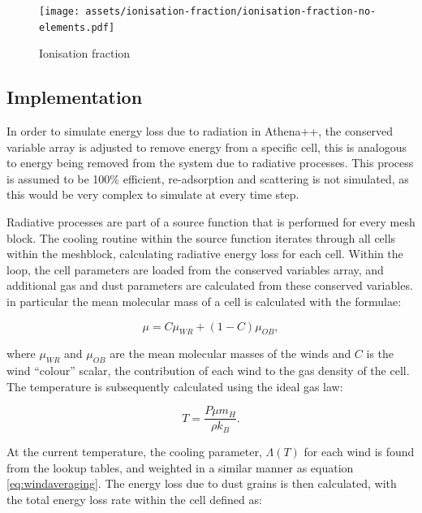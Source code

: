 \begin{figure}
  \centering
  \texttt{[image: assets/ionisation-fraction/ionisation-fraction-no-elements.pdf]}
  \caption[Ionisation fraction for OB and WC stars]{Ionisation fraction}
  \label{fig:electron-curve-no-elements}
\end{figure}



\subsection{Implementation}
\label{sec:cooling-implementation}

In order to simulate energy loss due to radiation in Athena++, the conserved variable array is adjusted to remove energy from a specific cell, this is analogous to energy being removed from the system due to radiative processes.
This process is assumed to be 100\% efficient, re-adsorption and scattering is not simulated, as this would be very complex to simulate at every time step.


Radiative processes are part of a source function that is performed for every mesh block.
The cooling routine within the source function iterates through all cells within the meshblock, calculating radiative energy loss for each cell.
Within the loop, the cell parameters are loaded from the conserved variables array, and additional gas and dust parameters are calculated from these conserved variables.
in particular the mean molecular mass of a cell is calculated with the formulae:

\begin{equation}
  \mu = C\mu_{WR} + (1-C) \mu_{OB}, \label{eq:windaveraging}
\end{equation}

\noindent
where $\mu_{WR}$ and $\mu_{OB}$ are the mean molecular masses of the winds and $C$ is the wind ``colour'' scalar, the contribution of each wind to the gas density of the cell.
The temperature is subsequently calculated using the ideal gas law:

\begin{equation}
  T = \frac{P \mu m_H}{\rho k_B}.
\end{equation}

\noindent
At the current temperature, the cooling parameter, $\Lambda(T)$ for each wind is found from the lookup tables, and weighted in a similar manner as equation \ref{eq:windaveraging}. The energy loss due to dust grains is then calculated, with the total energy loss rate within the cell defined as:

